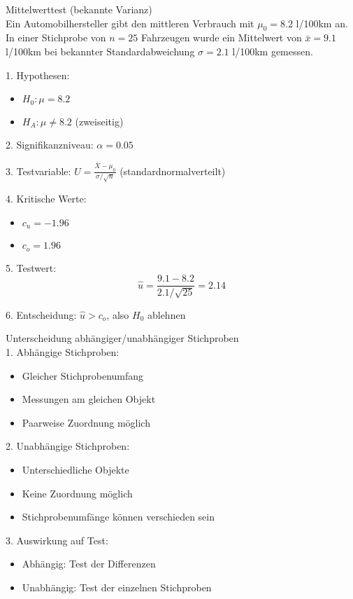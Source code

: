 \begin{example2}{Mittelwerttest (bekannte Varianz)}\\
Ein Automobilhersteller gibt den mittleren Verbrauch mit $\mu_0 = 8.2$ l/100km an. In einer Stichprobe von $n=25$ Fahrzeugen wurde ein Mittelwert von $\bar{x}=9.1$ l/100km bei bekannter Standardabweichung $\sigma=2.1$ l/100km gemessen.

1. Hypothesen:
   \begin{itemize}
     \item $H_0: \mu = 8.2$
     \item $H_A: \mu \neq 8.2$ (zweiseitig)
   \end{itemize}

2. Signifikanzniveau: $\alpha = 0.05$

3. Testvariable: $U = \frac{\bar{X}-\mu_0}{\sigma/\sqrt{n}}$ (standardnormalverteilt)

4. Kritische Werte:
   \begin{itemize}
     \item $c_u = -1.96$
     \item $c_o = 1.96$
   \end{itemize}

5. Testwert:
   $$\hat{u} = \frac{9.1-8.2}{2.1/\sqrt{25}} = 2.14$$

6. Entscheidung: $\hat{u} > c_o$, also $H_0$ ablehnen
\end{example2}

\begin{KR}{Unterscheidung abhängiger/unabhängiger Stichproben}\\
1. Abhängige Stichproben:
   \begin{itemize}
     \item Gleicher Stichprobenumfang
     \item Messungen am gleichen Objekt
     \item Paarweise Zuordnung möglich
   \end{itemize}

2. Unabhängige Stichproben:
   \begin{itemize}
     \item Unterschiedliche Objekte
     \item Keine Zuordnung möglich
     \item Stichprobenumfänge können verschieden sein
   \end{itemize}

3. Auswirkung auf Test:
   \begin{itemize}
     \item Abhängig: Test der Differenzen
     \item Unabhängig: Test der einzelnen Stichproben
   \end{itemize}
\end{KR}

